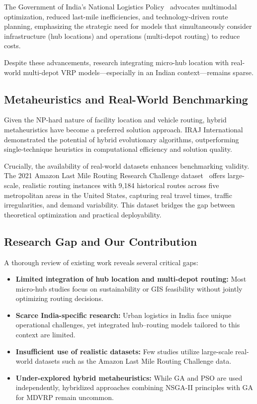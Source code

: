\documentclass[conference]{IEEEtran}
\begin{document}
The Government of India's National Logistics Policy~\cite{b7} advocates multimodal optimization, reduced last-mile inefficiencies, and technology-driven route planning, emphasizing the strategic need for models that simultaneously consider infrastructure (hub locations) and operations (multi-depot routing) to reduce costs.

Despite these advancements, research integrating micro-hub location with real-world multi-depot VRP models—especially in an Indian context—remains sparse.

\subsection{Metaheuristics and Real-World Benchmarking}

Given the NP-hard nature of facility location and vehicle routing, hybrid metaheuristics have become a preferred solution approach. IRAJ International~\cite{b4} demonstrated the potential of hybrid evolutionary algorithms, outperforming single-technique heuristics in computational efficiency and solution quality.

Crucially, the availability of real-world datasets enhances benchmarking validity. The 2021 Amazon Last Mile Routing Research Challenge dataset~\cite{b8} offers large-scale, realistic routing instances with 9,184 historical routes across five metropolitan areas in the United States, capturing real travel times, traffic irregularities, and demand variability. This dataset bridges the gap between theoretical optimization and practical deployability.

\subsection{Research Gap and Our Contribution}

A thorough review of existing work reveals several critical gaps:

\begin{itemize}
    \item \textbf{Limited integration of hub location and multi-depot routing:} Most micro-hub studies focus on sustainability or GIS feasibility without jointly optimizing routing decisions.
    \item \textbf{Scarce India-specific research:} Urban logistics in India face unique operational challenges, yet integrated hub–routing models tailored to this context are limited.
    \item \textbf{Insufficient use of realistic datasets:} Few studies utilize large-scale real-world datasets such as the Amazon Last Mile Routing Challenge data.
    \item \textbf{Under-explored hybrid metaheuristics:} While GA and PSO are used independently, hybridized approaches combining NSGA-II principles with GA for MDVRP remain uncommon.
\end{itemize}
\end{document}
